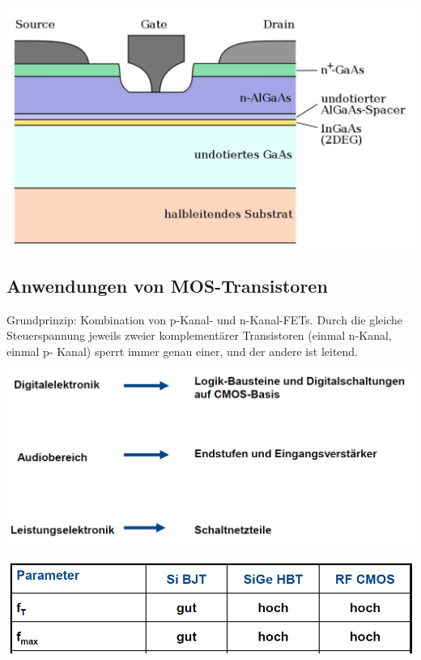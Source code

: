 	\begin{center}
		\includegraphics[width=0.4\linewidth]{Kapitel/Kap06/HEMT}
	\end{center}
	
\subsection{Anwendungen von MOS-Transistoren}
	Grundprinzip: Kombination von p-Kanal- und n-Kanal-FETs. Durch die gleiche Steuerspannung jeweils zweier komplementärer Transistoren (einmal n-Kanal, einmal p-	Kanal) sperrt immer genau einer, und der andere ist leitend.
	\begin{center}
		\includegraphics[width=0.7\linewidth]{Kapitel/Kap06/Anwendung}
	\end{center}
\begin{center}
	\includegraphics[width=0.7\linewidth]{Kapitel/Kap06/Hochfrequenzanwendungen}
\end{center}

	
